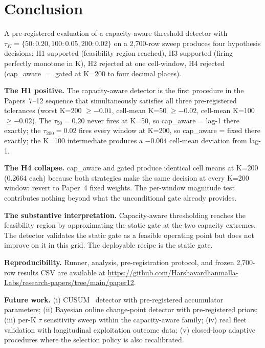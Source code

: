 \section{Conclusion}
\label{sec:conclusion}

A pre-registered evaluation of a capacity-aware threshold detector
with $\tau_K = \{50: 0.20, 100: 0.05, 200: 0.02\}$ on a 2{,}700-row
sweep produces four hypothesis decisions: H1 supported (feasibility
region reached), H3 supported (firing perfectly monotone in K),
H2 rejected at one cell-window, H4 rejected (cap\_aware $=$ gated at
K=200 to four decimal places).

\textbf{The H1 positive.} The capacity-aware detector is the first
procedure in the Papers~7--12 sequence that simultaneously satisfies
all three pre-registered tolerances (worst K=200 $\geq -0.01$,
cell-mean K=50 $\geq -0.02$, cell-mean K=100 $\geq -0.02$). The
$\tau_{50} = 0.20$ never fires at K=50, so cap\_aware = lag-1 there
exactly; the $\tau_{200} = 0.02$ fires every window at K=200, so
cap\_aware = fixed there exactly; the K=100 intermediate produces a
$-0.004$ cell-mean deviation from lag-1.

\textbf{The H4 collapse.} cap\_aware and gated produce identical
cell means at K=200 ($0.2664$ each) because both strategies make the
same decision at every K=200 window: revert to Paper~4 fixed
weights. The per-window magnitude test contributes nothing beyond
what the unconditional gate already provides.

\textbf{The substantive interpretation.} Capacity-aware
thresholding reaches the feasibility region by approximating the
static gate at the two capacity extremes. The detector validates the
static gate as a feasible operating point but does not improve on
it in this grid. The deployable recipe is the static gate.

\textbf{Reproducibility.} Runner, analysis, pre-registration protocol,
and frozen 2{,}700-row results CSV are available at
\url{https://github.com/Harshavardhanmalla-Labs/research-papers/tree/main/paper12}.

\textbf{Future work.} (i) CUSUM~\cite{page1954cusum} detector with
pre-registered accumulator parameters; (ii) Bayesian online
change-point detector with pre-registered priors; (iii) per-K $\tau$
sensitivity sweep within the capacity-aware family; (iv) real fleet
validation with longitudinal exploitation outcome data; (v) closed-loop
adaptive procedures where the selection policy is also recalibrated.
